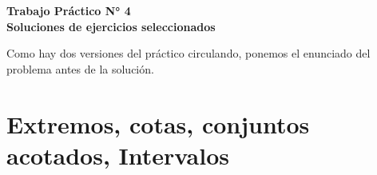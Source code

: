 \documentclass[12pt]{article}
\theoremstyle{definition}
\begin{document}
\fancyhf{}
\pagestyle{fancy}





\begin{centering}
\Large{\textbf{Trabajo Práctico N° 4}}\\
\large{\textbf{Soluciones de ejercicios seleccionados}}\\
\end{centering}
\vspace{1cm}

\noindent
Como hay dos versiones del práctico circulando, ponemos el enunciado del problema antes de la solución.

\section{Extremos, cotas, conjuntos acotados, Intervalos}
\end{document}
